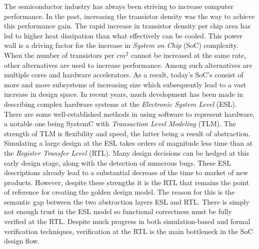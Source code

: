 \label{ch:intro}
The semiconductor industry has always been striving to increase computer performance. In the past, increasing the transistor density was the way to achieve this performance gain. The rapid increase in transistor density per chip area has led to higher heat dissipation than what effectively can be cooled. This power wall is a driving factor for the increase in \textit{System on Chip} (SoC) complexity. When the number of transistors per $cm^2$ cannot be increased at the same rate, other alternatives are used to increase performance. Among such alternatives are multiple cores and hardware accelerators. As a result, today's SoC's consist of more and more subsystems of increasing size which subsequently lead to a vast increase in design space. In recent years, much development has been made in describing complex hardware systems at the \textit{Electronic System Level} (ESL). There are some well-established methods in using software to represent hardware, a notable one being SystemC with \textit{Transaction Level Modeling} (TLM). The strength of TLM is flexibility and speed, the latter being a result of abstraction. Simulating a large design at the ESL takes orders of magnitude less time than at the \textit{Register Transfer Level} (RTL). Many design decisions can be hedged at this early design stage, along with the detection of numerous bugs. These ESL descriptions already lead to a substantial decrease of the time to market of new products. However, despite these strengths it is the RTL that remains the point of reference for creating the golden design model. The reason for this is the semantic gap between the two abstraction layers ESL and RTL. There is simply not enough trust in the ESL model so functional correctness must be fully verified at the RTL. Despite much progress in both simulation-based and formal verification techniques, verification at the RTL is the main bottleneck in the SoC design flow. \par

